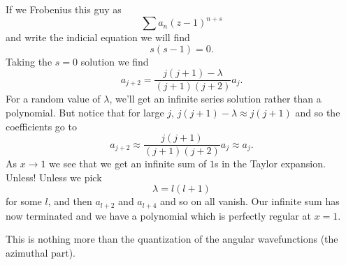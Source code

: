 \begin{exm}
    If we Frobenius this guy as
    \begin{equation}
        \sum a_n (z-1)^{n+s}
    \end{equation}
    and write the indicial equation we will find
    \begin{equation}
        s(s-1)=0.
    \end{equation}
    Taking the $s=0$ solution we find
    \begin{equation}
        a_{j+2} = \frac{j(j+1) -\lambda}{(j+1)(j+2)}a_j.
    \end{equation}
    For a random value of $\lambda$, we'll get an infinite series solution rather than a polynomial. But notice that for large $j$, $j(j+1)-\lambda \approx j(j+1)$ and so the coefficients go to
    \begin{equation}
        a_{j+2} \approx \frac{j(j+1)}{(j+1)(j+2)} a_j \approx a_j.
    \end{equation}
    As $x \to 1$ we see that we get an infinite sum of $1$s in the Taylor expansion. Unless! Unless we pick 
    \begin{equation}
        \lambda = l(l+1)
    \end{equation}
    for some $l$, and then $a_{l+2}$ and $a_{l+4}$ and so on all vanish. Our infinite sum has now terminated and we have a polynomial which is perfectly regular at $x=1$.
    
    This is nothing more than the quantization of the angular wavefunctions (the azimuthal part).
\end{exm}


